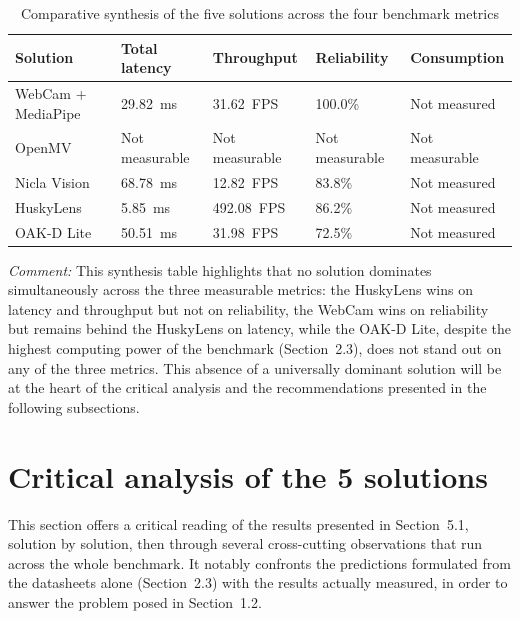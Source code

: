 \documentclass[12pt,a4paper]{report}
\begin{document}
	\begin{table}[H]
		\centering
		\small
		\renewcommand{\arraystretch}{1.2}
		\begin{tabularx}{\textwidth}{|l|X|X|X|X|}
			\hline
			\textbf{Solution} & \textbf{Total latency} & \textbf{Throughput} & \textbf{Reliability} & \textbf{Consumption} \\
			\hline
			WebCam + MediaPipe & 29.82~ms & 31.62~FPS & 100.0\% & Not measured \\
			\hline
			OpenMV & Not measurable & Not measurable & Not measurable & Not measurable \\
			\hline
			Nicla Vision & 68.78~ms & 12.82~FPS & 83.8\% & Not measured \\
			\hline
			HuskyLens & 5.85~ms & 492.08~FPS & 86.2\% & Not measured \\
			\hline
			OAK-D Lite & 50.51~ms & 31.98~FPS & 72.5\% & Not measured \\
			\hline
		\end{tabularx}
		\caption{Comparative synthesis of the five solutions across the four benchmark metrics}
		\label{tab:synthese-resultats}
	\end{table}
	
	\noindent\textit{Comment:} This synthesis table highlights that no solution dominates simultaneously across the three measurable metrics: the HuskyLens wins on latency and throughput but not on reliability, the WebCam wins on reliability but remains behind the HuskyLens on latency, while the OAK-D Lite, despite the highest computing power of the benchmark (Section~2.3), does not stand out on any of the three metrics. This absence of a universally dominant solution will be at the heart of the critical analysis and the recommendations presented in the following subsections.
	
	
	\section{Critical analysis of the 5 solutions}
	
	This section offers a critical reading of the results presented in Section~5.1, solution by solution, then through several cross-cutting observations that run across the whole benchmark. It notably confronts the predictions formulated from the datasheets alone (Section~2.3) with the results actually measured, in order to answer the problem posed in Section~1.2.
	
\end{document}
